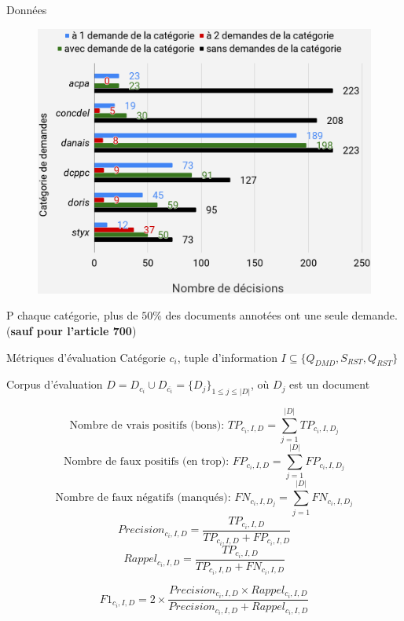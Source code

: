 \documentclass[newPxFont,pagenumber]{beamer}
\begin{document}
\begin{frame}{Données}
\begin{figure}
\includegraphics[width=\textwidth]{chartDataset.png}
\end{figure}
P chaque catégorie, plus de $50\%$ des documents annotées ont une seule demande. (\textbf{sauf pour l'article 700})
\end{frame}

\begin{frame}{Métriques d'évaluation}
Catégorie  $c_i$, tuple d'information $I \subseteq \lbrace Q_{DMD}, S_{RST}, Q_{RST} \rbrace $

Corpus d'évaluation  $D = D_{c_i} \cup D_{\overline{c_i}} = \lbrace D_j\rbrace_{1\leq j\leq \vert D \vert}$, où $D_j$  est un document

\scriptsize
\[\text{Nombre de vrais positifs (bons): } TP_{c_i,I,D} = \sum\limits^{\vert D \vert}_{j=1} TP_{c_i,I,D_j}\] 
\[\text{Nombre de faux positifs (en trop): } FP_{c_i,I,D} = \sum\limits^{\vert D \vert}_{j=1} FP_{c_i,I,D_j}\] 
\[\text{Nombre de faux négatifs (manqués): } FN_{c_i,I,D_j} = \sum\limits^{\vert D \vert}_{j=1} FN_{c_i,I,D_j}\]
\[Precision_{c_i,I,D} = \frac{TP_{c_i,I,D}}{TP_{c_i,I,D} + FP_{c_i,I,D}}\]
\[Rappel_{c_i,I,D} = \frac{TP_{c_i,I,D}}{TP_{c_i,I,D} + FN_{c_i,I,D}}\]

\[F1_{c_i,I,D} =2 \times \frac{Precision_{c_i,I,D} \times Rappel_{c_i,I,D}}{Precision_{c_i,I,D} + Rappel_{c_i,I,D}}\]


\end{frame}
\end{document}
